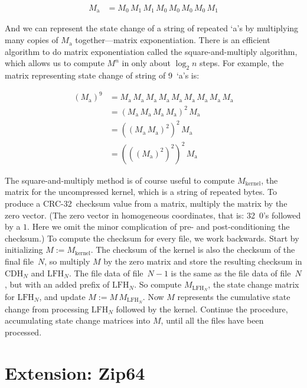 \documentclass[letterpaper,twocolumn,10pt]{article}
\newcommand{\CDH}{\mathrm{CDH}}
\newcommand{\LFH}{\mathrm{LFH}}
\newcommand{\CRC}{\mbox{CRC-32}}
\begin{document}
\begin{align*}
M_\mathrm{a} &= M_0 \, M_1 \, M_1 \, M_0 \, M_0 \, M_0 \, M_0 \, M_1
\end{align*}

\noindent
And we can represent the state change of a string of repeated `a's
by multiplying many copies of $M_\mathrm{a}$ together---matrix exponentiation.
There is an efficient algorithm to do matrix exponentiation
called the square-and-multiply algorithm,
which allows us to compute $M^n$
in only about $\log_2 n$ steps.
For example, the matrix representing state change
of string of 9~`a's is:

\begin{align*}
(M_\mathrm{a})^9 &= M_\mathrm{a} \, M_\mathrm{a} \, M_\mathrm{a} \, M_\mathrm{a} \, M_\mathrm{a} \, M_\mathrm{a} \, M_\mathrm{a} \, M_\mathrm{a} \, M_\mathrm{a} \\
&= (M_\mathrm{a} \, M_\mathrm{a} \, M_\mathrm{a} \, M_\mathrm{a})^2 \, M_\mathrm{a} \\
&= ((M_\mathrm{a} \, M_\mathrm{a})^2)^2 \, M_\mathrm{a} \\
&= (((M_\mathrm{a})^2)^2)^2 \, M_\mathrm{a}
\end{align*}

The square-and-multiply method is of course useful
to compute $M_\mathrm{kernel}$, the matrix for the uncompressed kernel,
which is a string of repeated bytes.
To produce a \CRC\ checksum value from a matrix,
multiply the matrix by the zero vector.
(The zero vector in homogeneous coordinates, that is:
32~$0$'s followed by a $1$.
Here we omit the minor complication of pre- and post-conditioning the checksum.)
To compute the checksum for every file, we work backwards.
Start by initializing $M := M_\mathrm{kernel}$.
The checksum of the kernel is also the checksum
of the final file~$N$,
so multiply $M$ by the zero matrix and store the resulting checksum in
$\CDH_N$ and $\LFH_N$.
The file data of file~$N-1$ is the same as the file data of file~$N$,
but with an added prefix of $\LFH_N$.
So compute $M_{\LFH_N}$, the state change matrix for $\LFH_N$,
and update $M := M \, M_{\LFH_N}$.
Now $M$ represents the cumulative state change from processing
$\LFH_N$ followed by the kernel.
Continue the procedure, accumulating state change matrices into $M$,
until all the files have been processed.


\section{Extension: Zip64}
\label{sec:zip64}
\end{document}
